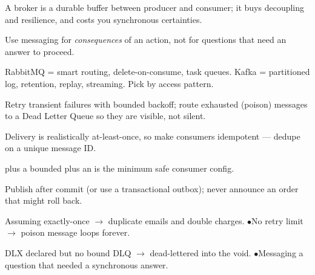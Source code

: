 \begin{tickcheck}
  \item A broker is a durable buffer between producer and consumer; it buys decoupling and resilience, and costs you synchronous certainties.
  \item Use messaging for \emph{consequences} of an action, not for questions that need an answer to proceed.
  \item RabbitMQ = smart routing, delete-on-consume, task queues. Kafka = partitioned log, retention, replay, streaming. Pick by access pattern.
  \item Retry transient failures with bounded backoff; route exhausted (poison) messages to a Dead Letter Queue so they are visible, not silent.
  \item Delivery is realistically at-least-once, so make consumers idempotent --- dedupe on a unique message ID.
\end{tickcheck}

\begin{wbitem}
  \item {} plus a bounded  plus an  is the minimum safe consumer config.
  \item Publish after commit (or use a transactional outbox); never announce an order that might roll back.
\end{wbitem}

\begin{wbitem}
  \item Assuming exactly-once $\rightarrow$ duplicate emails and double charges. \quad$\bullet$\quad No retry limit $\rightarrow$ poison message loops forever.
  \item DLX declared but no bound DLQ $\rightarrow$ dead-lettered into the void. \quad$\bullet$\quad Messaging a question that needed a synchronous answer.
\end{wbitem}

\begin{cheatsheet}
\end{cheatsheet}

